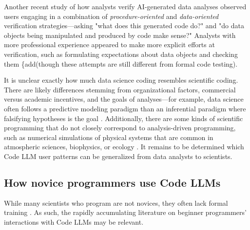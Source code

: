 Another recent study of how analysts verify AI-generated data analyses \cite{Gu2024HowAnalyses} observed users engaging in a combination of \textit{procedure-oriented} and \textit{data-oriented} verification strategies---asking "what does this generated code do?" and "do data objects being manipulated and produced by code make sense?" Analysts with more professional experience appeared to make more explicit efforts at verification, such as formulating expectations about data objects and checking them \{add{(though these attempts are still different from formal code testing)}. 

It is unclear exactly how much data science coding resembles scientific coding. There are likely  differences stemming from organizational factors, commercial versus academic incentives, and the goals of analyses---for example, data science often follows a predictive modeling paradigm than an inferential paradigm where falsifying hypotheses is the goal \cite{Breiman2001StatisticalCultures, Donoho201750Science}. Additionally, there are some kinds of scientific programming that do not closely correspond to analysis-driven programming, such as numerical simulations of physical systems that are common in atmospheric sciences, biophysics, or ecology \cite{Joppa2013TroublingUse,Basili2008UnderstandingPerspective,Johanson2018SoftwareScience, Prabhu2011AScience}. It remains to be determined which Code LLM user patterns can be generalized from data analysts to scientists.

\subsection{How novice programmers use Code LLMs}
While many scientists who program are not novices, they often lack formal training \cite{Hettrick2014ItsResearchers, Carver2022AStates, Nangia2017TrackResearch}. As such, the rapidly accumulating literature on beginner programmers' interactions with Code LLMs may be relevant. 

